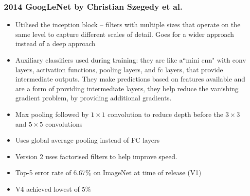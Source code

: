 \subsubsection{2014 GoogLeNet by Christian Szegedy et al.}
\begin{itemize}
    \item Utilised the inception block – filters with multiple sizes that operate on the same level to capture different scales of detail. Goes for a wider approach instead of a deep approach
    \item Auxiliary classifiers used during training: they are like a``mini cnn" with conv layers, activation functions, pooling layers, and fc layers, that provide intermediate outputs. They make predictions based on features available and are a form of providing intermediate layers, they help reduce the vanishing gradient problem, by providing additional gradients.
    \item Max pooling followed by $1\times 1$ convolution to reduce depth before the $ 3 \times 3$ and $5 \times 5$ convolutions
    \item Uses global average pooling instead of FC layers
    \item Version 2 uses factorised filters to help improve speed.
    \item Top-5 error rate of 6.67\% on ImageNet at time of release (V1)
    \item V4 achieved lowest of 5\%
\end{itemize}

